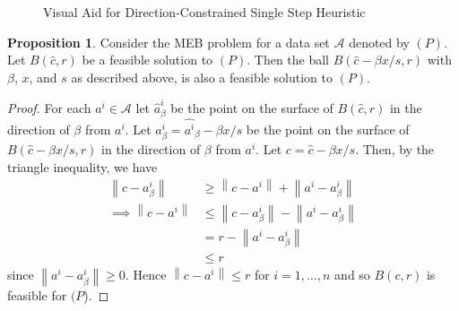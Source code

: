 \documentclass[11pt,twoside]{report}
\newcommand{\A}{\mathcal{A}} %
\newcommand{\norm}[1]{\left\lVert#1\right\rVert} %
\theoremstyle{definition}
\newtheorem{proposition}{Proposition}
\numberwithin{theorem}{section}
\numberwithin{definition}{section}
\numberwithin{lemma}{section}
\numberwithin{proposition}{section}
\numberwithin{equation}{section}
\numberwithin{figure}{section}
\begin{document}
\begin{figure}
    \centering
    \caption{Visual Aid for Direction-Constrained Single Step Heuristic}
    \label{vis aid derivation}
\end{figure}

\begin{proposition}\label{imp heuristic feasibility}
Consider the MEB problem for a data set $\A$ denoted by $(P)$. Let $B(\hat{c},r)$ be a feasible solution to $(P)$. Then the ball $B(\hat{c}-\beta x/s, r)$ with $\beta$, $x$, and $s$ as described above, is also a feasible solution to $(P)$.
\end{proposition}
\begin{proof}
For each $a^i\in\A$ let $\hat{a}^i_\beta$ be the point on the surface of $B(\hat{c},r)$ in the direction of $\beta$ from $a^i$. Let $a^i_\beta=\hat{a^i}_\beta - \beta x/s$ be the point on the surface of $B(\hat{c}-\beta x/s, r)$ in the direction of $\beta$ from $a^i$. Let $c=\hat{c}-\beta x/s$. Then, by the triangle inequality, we have
\begin{align*}
    \norm{c-a^i_\beta} &\geq \norm{c-a^i} + \norm{a^i-a^i_\beta} \\
    \implies \norm{c-a^i} &\leq \norm{c-a^i_\beta} - \norm{a^i-a^i_\beta} \\
    &= r-\norm{a^i-a^i_\beta} \\
    &\leq r
\end{align*}
since $\norm{a^i-a^i_\beta}\geq0$. Hence $\norm{c-a^i}\leq r$ for $i=1,\ldots,n$ and so $B(c, r)$ is feasible for $(P$).
\end{proof}
\end{document}
